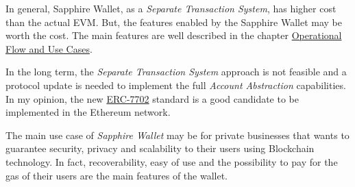 
In general, Sapphire Wallet, as a \textit{Separate Transaction System}, has higher cost than the actual EVM. But, the features enabled by the Sapphire Wallet may be worth the cost. The main features are well described in the chapter \hyperref[sec:operational_flow_and_use_cases]{Operational Flow and Use Cases}. 

In the long term, the \textit{Separate Transaction System} approach is not feasible and a protocol update is needed to implement the full \textit{Account Abstraction} capabilities. In my opinion, the new \hyperref[subsubsec:erc-7702]{ERC-7702} standard is a good candidate to be implemented in the Ethereum network.


The main use case of \textit{Sapphire Wallet} may be for private businesses that wants to guarantee security, privacy and scalability to their users using Blockchain technology. In fact, recoverability, easy of use and the possibility to pay for the gas of their users are the main features of the wallet.
